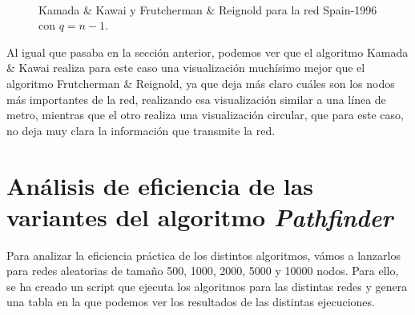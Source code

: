 \documentclass[paper=a4, fontsize=11pt]{article} %
\numberwithin{equation}{section} %
\numberwithin{figure}{section} %
\numberwithin{table}{section} %
\begin{document}
\begin{figure}[H]
    \centering
    \mbox {
      \qquad
    }
    \caption{Kamada \& Kawai y Frutcherman \& Reignold para la red Spain-1996 con $q=n-1$.}
    \label{spqN-1}
\end{figure}

Al igual que pasaba en la sección anterior, podemos ver que el algoritmo Kamada \& Kawai realiza para este caso una visualización muchísimo mejor que el algoritmo Frutcherman \& Reignold, ya que deja más claro cuáles son los nodos más importantes de la red, realizando esa visualización similar a una línea de metro, mientras que el otro realiza una visualización circular, que para este caso, no deja muy clara la información que transmite la red.


\section{Análisis de eficiencia de las variantes del algoritmo \textit{Pathfinder}}

Para analizar la eficiencia práctica de los distintos algoritmos, vámos a lanzarlos para redes aleatorias de tamaño 500, 1000, 2000, 5000 y 10000 nodos. Para ello, se ha creado un script que ejecuta los algoritmos para las distintas redes y genera una tabla en la que podemos ver los resultados de las distintas ejecuciones.
\end{document}
